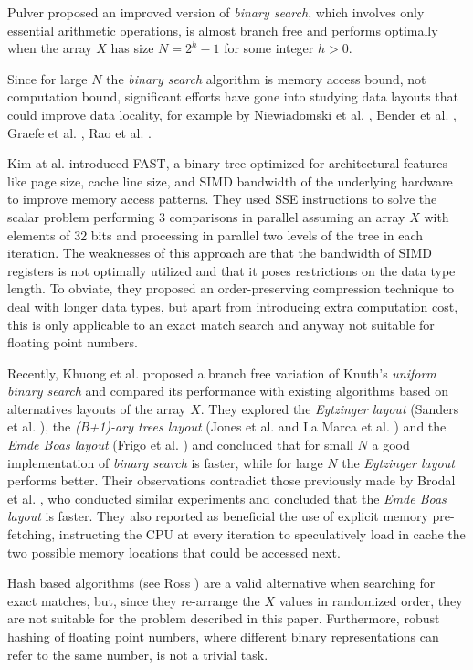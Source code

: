 \documentclass[preprint,1p,times]{elsarticle}
\begin{document}
Pulver \cite{Pulver2011} proposed an improved version of \textit{binary search}, which involves only essential arithmetic operations, is almost branch free and performs optimally when the array $X$ has size $N=2^h-1$ for some integer $h>0$.

Since for large $N$ the \textit{binary search} algorithm is memory access bound, not computation bound, significant efforts have gone into studying data layouts that could improve data locality, for example by Niewiadomski et al. \cite{Niewiadomski2006}, Bender et al. \cite{Bender2005}, Graefe et al. \cite{Graefe2001}, Rao et al. \cite{Rao1999}. 

Kim at al. \cite{Kim2011} introduced FAST, a binary tree optimized for architectural features like page size, cache line size, and SIMD bandwidth of the underlying hardware to improve memory access patterns. They used SSE instructions to solve the scalar problem performing 3 comparisons in parallel assuming an array $X$ with elements of 32 bits and processing in parallel two levels of the tree in each iteration. The weaknesses of this approach are that the bandwidth of SIMD registers is not optimally utilized and that it poses restrictions on the data type length. To obviate, they proposed an order-preserving compression technique to deal with longer data types, but apart from introducing extra computation cost, this is only applicable to an exact match search and anyway not suitable for floating point numbers.

Recently, Khuong et al. \cite{Morin2015} proposed a branch free variation of Knuth's \textit{uniform binary search} and compared its performance with existing algorithms based on alternatives layouts of the array $X$. They explored the \textit{Eytzinger layout} (Sanders et al. \cite{Sanders2004}), the \textit{(B+1)-ary trees layout} (Jones et al. \cite{Jones1986} and La Marca et al. \cite{LaMarca1996}) and the \textit{Emde Boas layout} (Frigo et al. \cite{Prokop1999}) and concluded that for small $N$ a good implementation of \textit{binary search} is faster, while for large $N$ the \textit{Eytzinger layout} performs better. Their observations contradict those previously made by Brodal et al. \cite{Brodal2002}, who conducted similar experiments and concluded that the \textit{Emde Boas layout} is faster. They also reported as beneficial the use of explicit memory pre-fetching, instructing the CPU at every iteration to speculatively load in cache the two possible memory locations that could be accessed next.

Hash based algorithms (see Ross \cite{Ross2007}) are a valid alternative when searching for exact matches, but, since they re-arrange the $X$ values in randomized order, they are not suitable for the problem described in this paper. Furthermore, robust hashing of floating point numbers, where different binary representations can refer to the same number, is not a trivial task.
\end{document}

